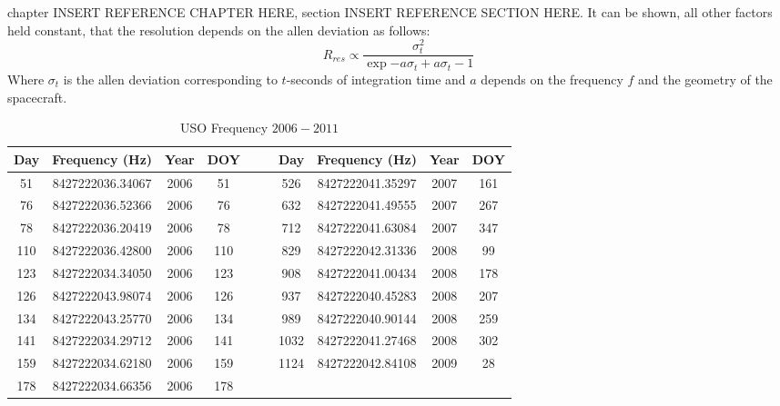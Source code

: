 \documentclass[crop=false,class=article,oneside]{standalone}
\begin{document}
            chapter INSERT REFERENCE CHAPTER HERE,
            section INSERT REFERENCE SECTION HERE.
            It can be shown, all other factors held
            constant, that the resolution depends on the
            \gls{allen deviation} as follows:
            \begin{equation}
                R_{res}\propto
                \frac{\sigma_{t}^{2}}
                     {\exp{-a\sigma_{t}}+a\sigma_{t}-1}
            \end{equation}
            Where $\sigma_{t}$ is the \gls{allen deviation}
            corresponding to $t$-seconds of integration
            time and $a$ depends on the frequency $f$ and
            the geometry of the spacecraft.
            \begin{table}[H]
                \centering
                \caption{USO Frequency $2006-2011$}
                \label{tab:usr_uso_freq_vals}
                \begin{tabular}{|ccccc|ccccc|}
                    \hline
                    Day&Frequency (Hz)&Year&DOY
                        &&&Day&Frequency (Hz)&Year&DOY\\
                    \hline
                    51&8427222036.34067&2006&51
                        &&&526&8427222041.35297&2007&161\\
                    76&8427222036.52366&2006&76
                        &&&632 &8427222041.49555&2007&267\\
                    78&8427222036.20419&2006&78
                        &&&712 &8427222041.63084&2007&347\\
                    110&8427222036.42800&2006&110
                        &&&829 &8427222042.31336&2008&99 \\
                    123&8427222034.34050&2006&123
                        &&&908 &8427222041.00434&2008&178\\
                    126&8427222043.98074&2006&126
                        &&&937 &8427222040.45283&2008&207\\
                    134&8427222043.25770&2006&134
                        &&&989 &8427222040.90144&2008&259\\
                    141&8427222034.29712&2006&141
                        &&&1032&8427222041.27468&2008&302\\
                    159&8427222034.62180&2006&159
                        &&&1124&8427222042.84108&2009& 28\\
                    178&8427222034.66356&2006&178

\end{tabular}
\end{table}
\end{document}
